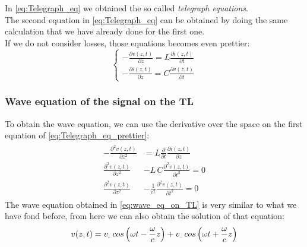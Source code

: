 In \cref{eq:Telegraph_eq} we obtained the so called \emph{telegraph equations}.\\
The second equation in \cref{eq:Telegraph_eq} can be obtained by doing the same calculation that we have already done for the first one.\\
If we do not consider losses, those equations becomes even prettier:
\begin{equation}\label{eq:Telegraph_eq_prettier}
  \begin{cases}
  -\frac{\partial v(z,t)}{\partial z}=L\frac{\partial i(z,t)}{\partial t}\\[5pt]
  -\frac{\partial i(z,t)}{\partial z}=C\frac{\partial v(z,t)}{\partial t}
  \end{cases}
\end{equation}
\subsubsection*{Wave equation of the signal on the TL}
To obtain the wave equation, we can use the derivative over the space on the first equation of \cref{eq:Telegraph_eq_prettier}:
\begin{align}
  \begin{split}
  -\frac{\partial^2 v(z,t)}{\partial z^2}&=L\frac{\partial}{\partial t}\frac{\partial i(z,t)}{\partial z}\\[5pt]
  \frac{\partial^2 v(z,t)}{\partial z^2}&-L\,C\frac{\partial^2 v(z,t)}{\partial t^2}=0\\[5pt]
  \frac{\partial^2 v(z,t)}{\partial z^2}&-\frac{1}{c^2}\frac{\partial^2 v(z,t)}{\partial t^2}=0
  \end{split}\label{eq:wave_eq_on_TL}
\end{align}
The wave equation obtained in \cref{eq:wave_eq_on_TL} is very similar to what we have fond before, from here we can also obtain the solution of that equation:
\begin{equation}
  v(z,t)=v_{\scaleto{+}{3pt}}\,cos\left(\omega t-\frac{\omega}{c}z\right)+v_{\scaleto{-}{3pt}}\,cos\left(\omega t+\frac{\omega}{c}z\right)
\end{equation}

